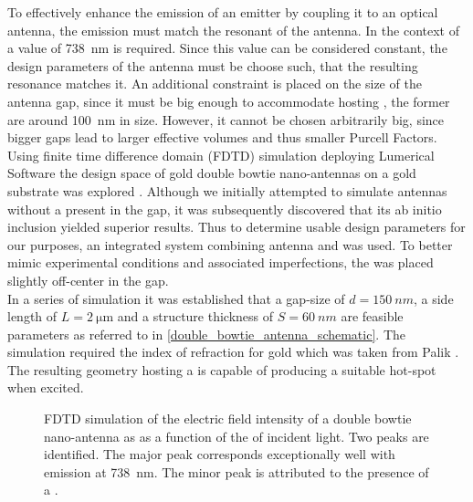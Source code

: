 		To effectively enhance the emission of an emitter by coupling it to an optical antenna, the emission \wl must match the resonant \wl of the antenna. In the context of \sivs a value of \SI{738}{nm} is required. Since this value can be considered constant, the design parameters of the antenna must be choose such, that the resulting resonance matches it. An additional constraint is placed on the size of the antenna gap, since it must be big enough to accommodate \nds hosting \sivs, the former are around \SI{100}{\nm} in size. However, it cannot be chosen arbitrarily big, since bigger gaps lead to larger effective volumes and thus smaller Purcell Factors.
		\\
		Using finite time difference domain (FDTD) simulation deploying Lumerical Software the design space of gold double bowtie nano-antennas on a gold substrate was explored \cite{nancy::thesis}. Although we initially attempted to simulate antennas without a \nd present in the gap, it was subsequently discovered that its ab initio inclusion yielded superior results. Thus to determine usable design parameters for our purposes, an integrated system combining antenna and \nd was used. To better mimic experimental conditions and associated imperfections, the \nd was placed slightly off-center in the gap.
		\\
		In a series of simulation it was established that a gap-size of $d = \SI{150}{nm}$, a side length of $L = \SI{2}{\micro\meter}$ and a structure thickness of $S = \SI{60}{nm}$ are feasible parameters as referred to in \cref{double_bowtie_antenna_schematic}. The simulation required the index of refraction for gold which was taken from Palik \cite{Palik, E. D. Handbook of optical constants of solids. 3, (Academic press, 1998)}.
		\\
		The resulting geometry hosting a \nd is capable of producing a suitable hot-spot when excited.

		\begin{figure}[htp]
				\centering
			\caption[Simulation of the resonance spectrum of a double bowtie antenna]{FDTD simulation of the electric field intensity of a double bowtie nano-antenna as as a function of the \wl of incident light. Two peaks are identified. The major peak corresponds exceptionally well with \siv emission at \SI{738}{nm}. The minor peak is attributed to the presence of a \nd.}
			\label{fig::antenna_fdtd_spectrum}
		\end{figure}

